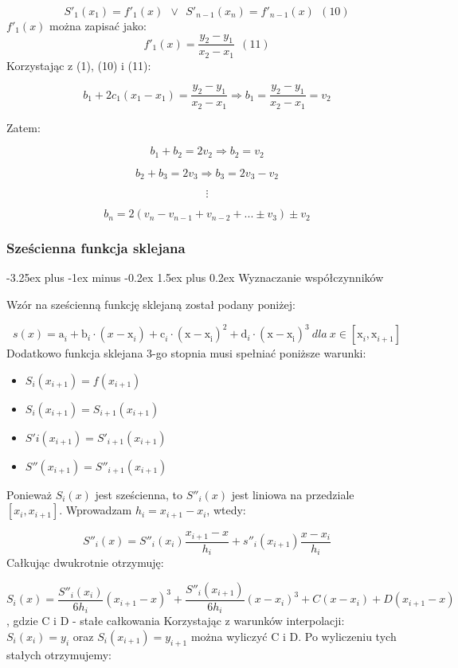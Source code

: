 \documentclass{article}
\makeatletter
\renewcommand{\paragraph}{\@startsection{paragraph}{4}{0ex}%
   {-3.25ex plus -1ex minus -0.2ex}%
   {1.5ex plus 0.2ex}%
   {\normalfont\normalsize\bfseries}}
\makeatother
\begin{document}
\[S'_1(x_1) = f'_1(x) \ \ \vee \ \ S'_{n-1}(x_n) = f'_{n-1}(x) \ \ (10)\]
\noindent
\(f'_1(x)\) można zapisać jako:
\[f'_1(x) = \frac{y_2-y_1}{x_2-x_1} \ \ (11)\]
\noindent
Korzystając z (1), (10) i (11):

\[b_1 + 2c_1(x_1 - x_1) = \frac{y_2 - y_1}{x_2-x_1} \Rightarrow  b_1 = \frac{y_2 - y_1}{x_2-x_1} = v_2\]

\bigbreak
\noindent
Zatem:

\[b_1 + b_2 = 2v_2 \Rightarrow b_2 = v_2\]

\[b_2 + b_3 = 2v_3 \Rightarrow b_3 = 2v_3 - v_2 \]

\[\vdots \]

\[b_n = 2(v_n-v_{n-1}+v_{n-2}+...\pm v_3) \pm v_2\]

\newpage

\subsubsection{Sześcienna funkcja sklejana}

\paragraph{Wyznaczanie współczynników}

Wzór na sześcienną funkcję sklejaną został podany poniżej:

\[s(x) = \mathrm{a}_{i}^{} + \mathrm{b}_{i}^{}\cdot (x - \mathrm{x}_{i}^{}) +\mathrm{c}_{i}^{}\cdot \mathrm{(x - \mathrm{x}_{i}^{})}_{}^{2} + \mathrm{d}_{i}^{}\cdot  \mathrm{(x-\mathrm{x}_{i}^{})}_{}^{3} \ dla \ x \in [\mathrm{x}_{i}^{}, \mathrm{x}_{i + 1}^{}]\]
\noindent
Dodatkowo funkcja sklejana 3-go stopnia musi spełniać poniższe warunki:
\begin{itemize}
\item \(S_i(x_{i+1}) = f(x_{i+1})\)
\item \(S_i(x_{i+1}) = S_{i+1}(x_{i+1})\)
\item \(S'i(x_{i+1}) = S'_{i+1}(x_{i+1})\)
\item \(S''(x_{i+1}) = S''_{i+1}(x_{i+1})\)
\end{itemize}
\noindent
Ponieważ \(S_i(x)\) jest sześcienna, to \(S''_i(x)\) jest liniowa na przedziale \([x_i, x_{i+1}]\). Wprowadzam \(h_i = x_{i+1} - x_i\), wtedy:

\[S''_i(x) = S''_i(x_i)\frac{x_{i+1}-x}{h_i} + s''_i(x_{i+1})\frac{x-x_i}{h_i}\]
\noindent
Całkując dwukrotnie otrzymuję:

\[S_i(x) = \frac{S''_i(x_i)}{6h_i}(x_{i+1}-x)^3 + \frac{S''_i(x_{i+1})}{6h_i}(x-x_i)^3+C(x-x_i)+D(x_{i+1}-x)\],
\noindent
gdzie C i D - stałe całkowania
\noindent
Korzystając z warunków interpolacji:
\noindent
\(S_i(x_i) = y_i\) oraz \(S_i(x_{i+1}) = y_{i+1}\) można wyliczyć C i D. Po wyliczeniu tych stałych otrzymujemy:
\end{document}
